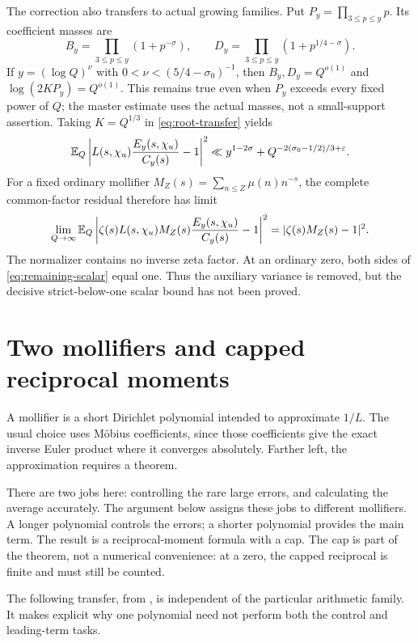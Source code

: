The correction also transfers to actual growing families. Put $P_y=\prod_{3\le p\le y}p$. Its coefficient masses are
\[
 B_y=\prod_{3\le p\le y}(1+p^{-\sigma}),\qquad
 D_y=\prod_{3\le p\le y}(1+p^{1/4-\sigma}).
\]
If $y=(\log Q)^\nu$ with $0<\nu<(5/4-\sigma_0)^{-1}$, then $B_y,D_y=Q^{o(1)}$ and $\log(2KP_y)=Q^{o(1)}$. This remains true even when $P_y$ exceeds every fixed power of $Q$; the master estimate uses the actual masses, not a small-support assertion. Taking $K=Q^{1/3}$ in \eqref{eq:root-transfer} yields
\begin{equation}\label{eq:actual-variance-removal}
 \mathbb E_Q\left|L(s,\chi_u)\frac{E_y(s,\chi_u)}{C_y(s)}-1\right|^2
 \ll y^{1-2\sigma}+Q^{-2(\sigma_0-1/2)/3+\varepsilon}.
\end{equation}
For a fixed ordinary mollifier $M_Z(s)=\sum_{n\le Z}\mu(n)n^{-s}$, the complete common-factor residual therefore has limit
\begin{equation}\label{eq:remaining-scalar}
 \lim_{Q\to\infty}\mathbb E_Q\left|
 \zeta(s)L(s,\chi_u)M_Z(s)\frac{E_y(s,\chi_u)}{C_y(s)}-1
 \right|^2=\lvert\zeta(s)M_Z(s)-1\rvert^2.
\end{equation}
The normalizer contains no inverse zeta factor. At an ordinary zero, both sides of \eqref{eq:remaining-scalar} equal one. Thus the auxiliary variance is removed, but the decisive strict-below-one scalar bound has not been proved.

\section{Two mollifiers and capped reciprocal moments}\label{sec:capped}

A mollifier is a short Dirichlet polynomial intended to approximate $1/L$. The usual choice uses M\"obius coefficients, since those coefficients give the exact inverse Euler product where it converges absolutely. Farther left, the approximation requires a theorem.

There are two jobs here: controlling the rare large errors, and calculating the average accurately. The argument below assigns these jobs to different mollifiers. A longer polynomial controls the errors; a shorter polynomial provides the main term. The result is a reciprocal-moment formula with a cap. The cap is part of the theorem, not a numerical convenience: at a zero, the capped reciprocal is finite and must still be counted.

The following transfer, from \cite{R989}, is independent of the particular arithmetic family. It makes explicit why one polynomial need not perform both the control and leading-term tasks.

